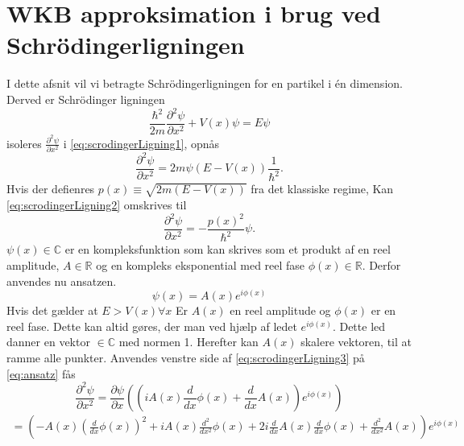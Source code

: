 \section{WKB approksimation i brug ved Schrödingerligningen}
I dette afsnit vil vi betragte Schrödingerligningen for en partikel i én dimension. Derved er Schrödinger ligningen
%
\begin{equation}
    \frac{\hbar^2}{2m}\frac{\partial^2 \psi}{\partial x^2} + V(x) \psi = E \psi
    \label{eq:scrodingerLigning1}
\end{equation}
%
isoleres $\frac{\partial^2 \psi}{\partial x^2}$ i \cref{eq:scrodingerLigning1}, opnås
%
\begin{equation}
    \frac{\partial^2 \psi}{\partial x^2} = 2m\psi (E  - V(x)) \frac{1}{\hbar^2}.
    \label{eq:scrodingerLigning2}
\end{equation}
%
Hvis der defienres $p(x) \equiv \sqrt{2m(E-V(x))}$ fra det klassiske regime, Kan \cref{eq:scrodingerLigning2} omskrives til
%
\begin{equation}
    \frac{\partial^2 \psi}{\partial x^2} = - \frac{p(x)^2}{\hbar^2} \psi.
    \label{eq:scrodingerLigning3}
\end{equation}
%
$\psi(x) \in \mathbb{C}$ er en kompleksfunktion som kan skrives som et produkt af en reel amplitude, $A \in \mathbb{R}$ og en kompleks eksponential med reel fase $\phi(x)\in \mathbb{R}$. Derfor anvendes nu ansatzen.
%
\begin{equation}
    \psi(x) = A(x) e^{i \phi(x)}
    \label{eq:ansatz}
\end{equation}
%
Hvis det gælder at $ E > V(x) \forall x$ Er $A(x)$ en reel amplitude og $\phi(x)$ er en reel fase. Dette kan altid gøres, der man ved hjælp af ledet  $e^{i \phi(x)} $. Dette led danner en vektor $ \in \mathbb{C}$ med normen 1. Herefter kan $A(x)$  skalere vektoren, til at ramme alle punkter. Anvendes venstre side af \cref{eq:scrodingerLigning3} på \cref{eq:ansatz} fås
%
\begin{equation}
    \frac{\partial^2 \psi}{\partial x^2} = \frac{\partial \psi}{\partial x} \left( \left(i A{\left (x \right )} \frac{d}{d x} \phi{\left (x \right )} + \frac{d}{d x} A{\left (x \right )}\right) e^{i \phi{\left (x \right)}} \right)
    \label{eq:diff1gange}
\end{equation}
%
\begin{align}
    = \left(- A{\left (x \right )} \left(\frac{d}{d x} \phi{\left (x \right )}\right)^{2} + i A{\left (x \right )} \frac{d^{2}}{d x^{2}}  \phi{\left (x \right )} + 2 i \frac{d}{d x} A{\left (x \right )} \frac{d}{d x} \phi{\left (x \right )} + \frac{d^{2}}{d x^{2}}  A{\left (x \right )}\right) e^{i \phi{\left (x \right )}}
    \label{eq:diff2gange}
\end{align}
